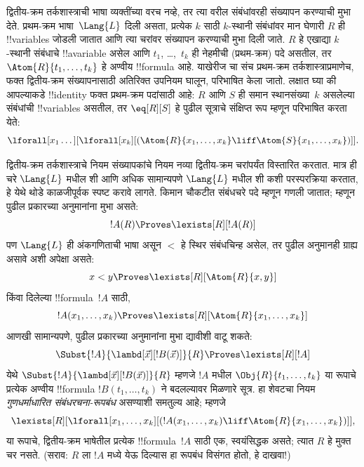 \documentclass[../../../include/open-logic-section]{subfiles}
\begin{document}


द्वितीय-क्रम तर्कशास्त्राची भाषा व्यक्तींच्या वरच नव्हे, तर त्या
वरील संबंधांवरही संख्यापन करण्याची मुभा देते. प्रथम-क्रम
भाषा~$\Lang{L}$ दिली असता, प्रत्येक $k$ साठी $k$-स्थानी संबंधांवर मान घेणारी
$R$ ही !!{variable}s जोडली जातात आणि त्या चरांवर संख्यापन करण्याची मुभा दिली
जाते. $R$ हे एखाद्या $k$-स्थानी संबंधाचे !!a{variable} असेल आणि $t_1$,
\dots,~$t_k$ ही नेहमीची (प्रथम-क्रम) पदे असतील, तर
$\Atom{R}{t_1,\dots,t_k}$ हे अण्वीय !!{formula} आहे. याखेरीज चा
संच प्रथम-क्रम तर्कशास्त्राप्रमाणेच, फक्त द्वितीय-क्रम संख्यापनासाठी अतिरिक्त
उपनियम घालून, परिभाषित केला जातो. लक्षात घ्या की आपल्याकडे !!{identity} फक्त
प्रथम-क्रम पदांसाठी आहे: $R$ आणि $S$ ही समान स्थानसंख्या~$k$ असलेल्या
संबंधांची !!{variable}s असतील, तर $\eq[R][S]$ हे पुढील सूत्राचे संक्षिप्त रूप
म्हणून परिभाषित करता येते:
\[
\lforall[x_1 \dots][\lforall[x_k][(\Atom{R}{x_1, \dots, x_k} \liff
  \Atom{S}{x_1, \dots, x_k})]].
\]

द्वितीय-क्रम तर्कशास्त्राचे नियम संख्यापकांचे नियम नव्या द्वितीय-क्रम चरांपर्यंत
विस्तारित करतात. मात्र ही चरे $\Lang{L}$ मधील शी आणि अधिक
सामान्यपणे $\Lang{L}$ मधील शी कशी परस्परक्रिया करतात, हे येथे
थोडे काळजीपूर्वक स्पष्ट करावे लागते. किमान चौकटीत संबंधचरे पदे म्हणून गणली
जातात; म्हणून पुढील प्रकारच्या अनुमानांना मुभा असते:
\[
!A(R) \Proves \lexists[R][!A(R)]
\]
पण $\Lang{L}$ ही अंकगणिताची भाषा असून $<$ हे स्थिर संबंधचिन्ह असेल, तर पुढील
अनुमानही ग्राह्य असावे अशी अपेक्षा असते:
\[
x < y \Proves \lexists[R][\Atom{R}{x,y}]
\]
किंवा दिलेल्या !!{formula}~$!A$ साठी,
\[
!A(x_1, \dots, x_k) \Proves \lexists[R][\Atom{R}{x_1,\dots,x_k}]
\]
आणखी सामान्यपणे, पुढील प्रकारच्या अनुमानांना मुभा द्यावीशी वाटू शकते:
\[
\Subst{!A}{\lambd[\vec x][!B(\vec x)]}{R} \Proves
\lexists[R][!A]
\]
येथे $\Subst{!A}{\lambd[\vec x][!B(\vec x)]}{R}$ म्हणजे $!A$ मधील
$\Obj{R}{t_1,\dots,t_k}$ या रूपाचे प्रत्येक अण्वीय !!{formula}
$!B(t_1, \dots, t_k)$ ने बदलल्यावर मिळणारे सूत्र. हा शेवटचा नियम
{\em गुणधर्माधारित संबंधरचना-रूपबंध} असण्याशी समतुल्य आहे; म्हणजे
\[
\lexists[R][\lforall[x_1, \dots, x_k][(!A(x_1, \dots, x_k) \liff
\Atom{R}{x_1, \dots, x_k})]],
\]
या रूपाचे, द्वितीय-क्रम भाषेतील प्रत्येक !!{formula}~$!A$ साठी एक,
स्वयंसिद्धक असते; त्यात $R$ हे मुक्त चर नसते. (सराव: $R$ ला $!A$ मध्ये येऊ
दिल्यास हा रूपबंध विसंगत होतो, हे दाखवा!)
\end{document}
